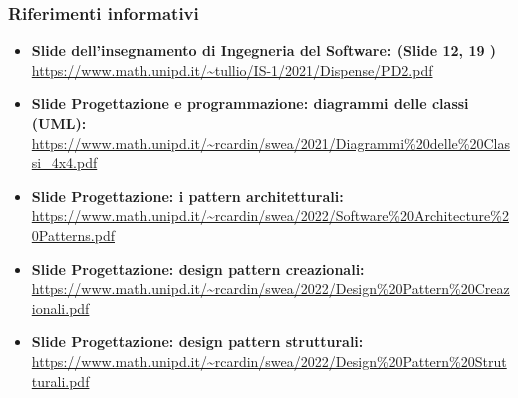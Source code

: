 \subsubsection{Riferimenti informativi}
\begin{itemize}
	\item 
    {\textbf{Slide dell'insegnamento di Ingegneria del Software: (Slide 12, 19 )}}\\\url{https://www.math.unipd.it/~tullio/IS-1/2021/Dispense/PD2.pdf}
	\item
	{\textbf{Slide Progettazione e programmazione: diagrammi delle classi (UML):}}\\\url{https://www.math.unipd.it/~rcardin/swea/2021/Diagrammi%20delle%20Classi_4x4.pdf}
	\item
	{\textbf{Slide Progettazione: i pattern architetturali:}}\\\url{https://www.math.unipd.it/~rcardin/swea/2022/Software%20Architecture%20Patterns.pdf}
	\item 
	{\textbf{Slide Progettazione: design pattern creazionali:}}\\\url{https://www.math.unipd.it/~rcardin/swea/2022/Design%20Pattern%20Creazionali.pdf}
	\item 
	{\textbf{Slide Progettazione: design pattern strutturali:}}\\\url{https://www.math.unipd.it/~rcardin/swea/2022/Design%20Pattern%20Strutturali.pdf}
\end{itemize}
